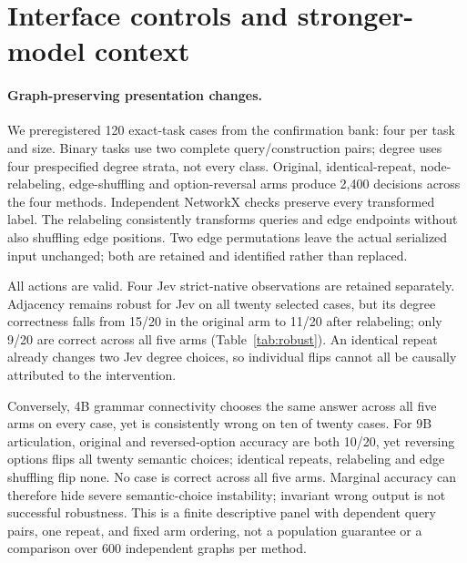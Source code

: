 \section{Interface controls and stronger-model context}
\label{sec:controls}
\paragraph{Graph-preserving presentation changes.}
We preregistered 120 exact-task cases from the confirmation bank: four per
task and size. Binary tasks use two complete query/construction pairs;
degree uses four prespecified degree strata, not every class. Original,
identical-repeat, node-relabeling, edge-shuffling and option-reversal arms
produce 2,400 decisions across the four methods. Independent NetworkX checks
preserve every transformed label. The relabeling consistently transforms
queries and edge endpoints without also shuffling edge positions.
Two edge permutations leave the actual serialized input unchanged; both
are retained and identified rather than replaced.

All actions are valid. Four Jev strict-native observations are retained
separately. Adjacency remains robust for Jev on all twenty selected cases,
but its degree correctness falls from 15/20 in the original arm to 11/20
after relabeling; only 9/20 are correct across all five arms
(Table~\ref{tab:robust}). An identical repeat already changes two Jev
degree choices, so individual flips cannot all be causally attributed to
the intervention.

Conversely, 4B grammar connectivity chooses the same answer across all five
arms on every case, yet is consistently wrong on ten of twenty cases.
For 9B articulation, original and reversed-option accuracy are both 10/20,
yet reversing options flips all twenty semantic choices; identical repeats,
relabeling and edge shuffling flip none. No case is correct across all five
arms. Marginal accuracy can therefore
hide severe semantic-choice instability; invariant wrong output is not
successful robustness. This is a finite descriptive panel with dependent
query pairs, one repeat, and fixed arm ordering, not a population guarantee
or a comparison over 600 independent graphs per method.

\begin{table}[t]
\centering\small

\caption{Cases correct in all five presentation arms, over twenty selected
cases per task. Full arm accuracies and paired choice-flip counts appear in
the appendix. The degree panel uses four prespecified degree strata per size.}
\label{tab:robust}
\end{table}

